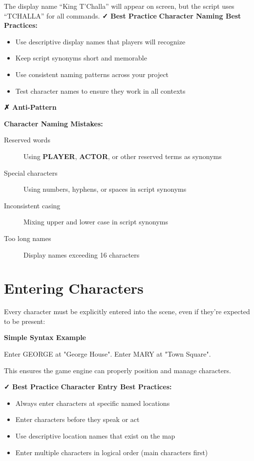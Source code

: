 \documentclass[11pt,letterpaper,oldstylefigures]{memoir}
\newcommand{\stagedir}[1]{#1\par\vspace{1\baselineskip}}
\newenvironment{FountainExample}
  {\begingroup
  \ttfamily\small
   \setlength{\parindent}{0pt}
  \setlength{\parskip}{0.5em}
  \allowdisplaybreaks
  \setlength{\displaywidowpenalty}{0}
  \setlength{\widowpenalty}{0}
  \setlength{\clubpenalty}{0}
  \setlength{\interlinepenalty}{0}
}
  {\endgroup}
\newenvironment{AntiPattern}
{\begingroup
\small
\setlength{\parindent}{0pt}
\setlength{\parskip}{0.5em}
\allowdisplaybreaks
\setlength{\displaywidowpenalty}{0}
\setlength{\widowpenalty}{0}
\setlength{\clubpenalty}{0}
\setlength{\interlinepenalty}{0}
\begin{tcolorbox}[
    colback=red!5,
    colframe=red!75!black,
    boxrule=0.5pt,
    arc=2pt,
    left=0.5em,
    right=0.5em,
    top=0.25em,
    bottom=0.25em
]
\textbf{✗ Anti-Pattern}
\end{tcolorbox}\par
}
{\endgroup}
\newenvironment{SimpleExample}
{\begingroup
\small
\setlength{\parindent}{0pt}
\setlength{\parskip}{0.5em}
\allowdisplaybreaks
\setlength{\displaywidowpenalty}{0}
\setlength{\widowpenalty}{0}
\setlength{\clubpenalty}{0}
\setlength{\interlinepenalty}{0}
\begin{tcolorbox}[
    colback=blue!5,
    colframe=blue!75!black,
    boxrule=0.5pt,
    arc=2pt,
    left=0.5em,
    right=0.5em,
    top=0.25em,
    bottom=0.25em
]
\textbf{Simple Syntax Example}
\end{tcolorbox}\par
}
{\endgroup}
\newcommand{\paragraphbreak}{\vspace{0.5em}}
\newcommand{\fountain}[1]{\textbf{#1}}
\begin{document}
The display name ``King T'Challa'' will appear on screen, but the script uses ``TCHALLA'' for all commands.
\textbf{✓ Best Practice}
\textbf{Character Naming Best Practices:}
\begin{itemize}
\item Use descriptive display names that players will recognize
\item Keep script synonyms short and memorable
\item Use consistent naming patterns across your project
\item Test character names to ensure they work in all contexts
\end{itemize}
\begin{AntiPattern}
\textbf{Character Naming Mistakes:}
\begin{description}
\item[Reserved words] Using \fountain{PLAYER}, \fountain{ACTOR}, or other reserved terms as synonyms
\item[Special characters] Using numbers, hyphens, or spaces in script synonyms
\item[Inconsistent casing] Mixing upper and lower case in script synonyms
\item[Too long names] Display names exceeding 16 characters
\end{description}
\end{AntiPattern}

\section{Entering Characters}
\paragraphbreak

Every character must be explicitly entered into the scene, even if they're expected to be present:

\begin{SimpleExample}
\begin{FountainExample}
\stagedir{Enter GEORGE at "George House". Enter MARY at "Town Square".}
\end{FountainExample}
\end{SimpleExample}

This ensures the game engine can properly position and manage characters.

\textbf{✓ Best Practice}
\textbf{Character Entry Best Practices:}
\begin{itemize}
\item Always enter characters at specific named locations
\item Enter characters before they speak or act
\item Use descriptive location names that exist on the map
\item Enter multiple characters in logical order (main characters first)
\end{itemize}
\end{document}
